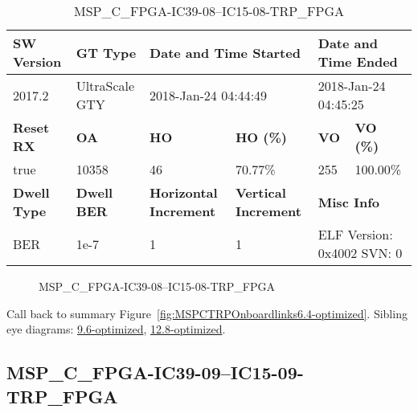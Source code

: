 \begin{table}[h]
\centering
\caption{MSP\_C\_FPGA-IC39-08--IC15-08-TRP\_FPGA}
\label{tab:MSPCFPGAIC3908IC1508TRPFPGA6.4-optimized}
\begin{tabular}{@{}|l|l|l|l|l|l|@{}}
\toprule
\textbf{SW Version}                & \textbf{GT Type}   & \multicolumn{2}{l|}{\textbf{Date and Time Started}}            & \multicolumn{2}{l|}{\textbf{Date and Time Ended}}        \\ \midrule
2017.2                       & UltraScale GTY          & \multicolumn{2}{l|}{2018-Jan-24 04:44:49}                   & \multicolumn{2}{l|}{2018-Jan-24 04:45:25}               \\ \midrule
\textbf{Reset RX}                  & \textbf{OA} & \textbf{HO}   & \textbf{HO (\%)} & \textbf{VO} & \textbf{VO (\%)} \\ \midrule
true & 10358        & 46          & 70.77\%        & 255        & 100.00\%       \\ \midrule
\textbf{Dwell Type}                & \textbf{Dwell BER} & \textbf{Horizontal Increment} & \textbf{Vertical Increment}    & \multicolumn{2}{l|}{\textbf{Misc Info}}                  \\ \midrule
BER                            & 1e-7        & 1        & 1           & \multicolumn{2}{l|}{ELF Version: 0x4002 SVN: 0}                         \\ \bottomrule
\end{tabular}
\end{table}

\begin{figure}[h]
\caption{MSP\_C\_FPGA-IC39-08--IC15-08-TRP\_FPGA} \label{fig:MSPCFPGAIC3908IC1508TRPFPGA6.4-optimized}
\end{figure}

Call back to summary Figure~\ref{fig:MSPCTRPOnboardlinks6.4-optimized}.
Sibling eye diagrams: \hyperref[sec:MSPCFPGAIC3908IC1508TRPFPGA9.6-optimized]{9.6-optimized}, \hyperref[sec:MSPCFPGAIC3908IC1508TRPFPGA12.8-optimized]{12.8-optimized}.

\clearpage
\newpage


\subsection{MSP\_C\_FPGA-IC39-09--IC15-09-TRP\_FPGA}\label{sec:MSPCFPGAIC3909IC1509TRPFPGA6.4-optimized}

